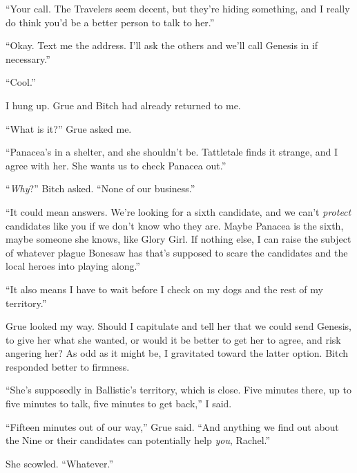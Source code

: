 ``Your call.  The Travelers seem decent, but they're hiding something, and I really do think you'd be a better person to talk to her.''



``Okay.  Text me the address.  I'll ask the others and we'll call Genesis in if necessary.''



``Cool.''



I hung up.  Grue and Bitch had already returned to me.



``What is it?'' Grue asked me.



``Panacea's in a shelter, and she shouldn't be.  Tattletale finds it strange, and I agree with her.  She wants us to check Panacea out.''



``\emph{Why}?'' Bitch asked.  ``None of our business.''



``It could mean answers.  We're looking for a sixth candidate, and we can't \emph{protect }candidates like you if we don't know who they are.  Maybe Panacea is the sixth, maybe someone she knows, like Glory Girl.  If nothing else, I can raise the subject of whatever plague Bonesaw has that's supposed to scare the candidates and the local heroes into playing along.''



``It also means I have to wait before I check on my dogs and the rest of my territory.''



Grue looked my way.  Should I capitulate and tell her that we could send Genesis, to give her what she wanted, or would it be better to get her to agree, and risk angering her?  As odd as it might be, I gravitated toward the latter option.  Bitch responded better to firmness.



``She's supposedly in Ballistic's territory, which is close.  Five minutes there, up to five minutes to talk, five minutes to get back,'' I said.



``Fifteen minutes out of our way,'' Grue said.  ``And anything we find out about the Nine or their candidates can potentially help \emph{you}, Rachel.''



She scowled.  ``Whatever.''



